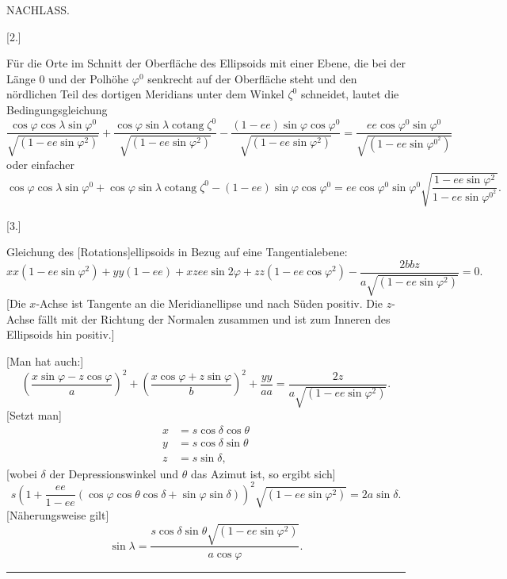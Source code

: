 \clearpage
{}\hfill NACHLASS.\hfill\mbox{}\par
\begin{center}[2.]\par
[Gleichung der Vertikalebene des Rotationsellipsoids.]\end{center}
Für die Orte im Schnitt der Oberfläche des Ellipsoids mit einer Ebene, die bei der Länge $0$
und der Polhöhe $\varphi^0$ senkrecht auf der Oberfläche steht und den nördlichen Teil des
dortigen Meridians unter dem Winkel $\zeta^0$ schneidet, lautet die Bedingungsgleichung
\[
\frac{\cos\varphi\cos\lambda\sin\varphi^0}{\sqrt{(1-ee\sin\varphi^2)}}+\frac{\cos\varphi\sin\lambda\operatorname{cotang}\zeta^0}{\sqrt{(1-ee\sin\varphi^2)}}-\frac{(1-ee)\sin\varphi\cos\varphi^0}{\sqrt{(1-ee\sin\varphi^2)}}=\frac{ee\cos\varphi^0\sin\varphi^0}{\sqrt{(1-ee\sin\varphi^{0^2})}}
\]
oder einfacher
\[
\cos\varphi\cos\lambda\sin\varphi^0+\cos\varphi\sin\lambda\operatorname{cotang}\zeta^0-(1-ee)\sin\varphi\cos\varphi^0=ee\cos\varphi^0\sin\varphi^0\sqrt{\frac{1-ee\sin\varphi^2}{1-ee\sin\varphi^{0^2}}}.
\]
\begin{center}[3.]\end{center}
Gleichung des [Rotations]ellipsoids in Bezug auf eine Tangentialebene:
\[
xx(1-ee\sin\varphi^2)+yy(1-ee)+xzee\sin2\varphi+zz(1-ee\cos\varphi^2)-\frac{2bbz}{a\sqrt{(1-ee\sin\varphi^2)}}=0.
\]
[Die $x$-Achse ist Tangente an die Meridianellipse und nach Süden positiv. Die $z$-Achse
fällt mit der Richtung der Normalen zusammen und ist zum Inneren des Ellipsoids hin positiv.]

[Man hat auch:]
\[
\left(\frac{x\sin\varphi-z\cos\varphi}{a}\right)^2+\left(\frac{x\cos\varphi+z\sin\varphi}{b}\right)^2+\frac{yy}{aa}=\frac{2z}{a\sqrt{(1-ee\sin\varphi^2)}}.
\]
[Setzt man]
\[
\begin{aligned}
x&=s\cos\delta\cos\theta\\
y&=s\cos\delta\sin\theta\\
z&=s\sin\delta,
\end{aligned}
\]
[wobei $\delta$ der Depressionswinkel und $\theta$ das Azimut ist, so ergibt sich]
\[
s\left(1+\frac{ee}{1-ee}(\cos\varphi\cos\theta\cos\delta+\sin\varphi\sin\delta)\right)^2\sqrt{(1-ee\sin\varphi^2)}=2a\sin\delta.
\]
[Näherungsweise gilt]
\[
\sin\lambda=\frac{s\cos\delta\sin\theta\sqrt{(1-ee\sin\varphi^2)}}{a\cos\varphi}.
\]
\begin{center}\rule{.18\textwidth}{.4pt}\end{center}

